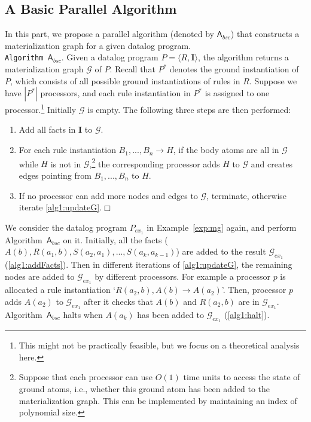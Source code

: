 \documentclass[final,1p,times]{elsarticle}
\begin{document}
\subsection{A Basic Parallel Algorithm}

In this part, we propose a parallel algorithm
(denoted by $\mathsf{A}_{bsc}$) that constructs a materialization graph for a given datalog program.\\

\noindent\texttt{Algorithm $\mathsf{A}_{bsc}$}. Given a datalog program $P=\langle R, \textbf{I}\rangle$,
the algorithm returns a materialization graph $\mathcal{G}$ of $P$.
Recall that $P^*$ denotes the ground instantiation of $P$,
which consists of all possible ground instantiations of rules in $R$.
Suppose we have $|P^*|$ processors, and each rule instantiation in $P^*$ is
assigned to one processor.\footnote{This might not be practically feasible,
but we focus on a theoretical analysis here.}
Initially $\mathcal{G}$ is empty. The following three steps are then performed:
\begin{enumerate}[leftmargin=8ex,label=(\textit{Step \arabic*}),ref=Step~\arabic*]
\item Add all facts in $\textbf{I}$ to $\mathcal{G}$.\label{alg1:addFacts}
\item For each rule instantiation $B_1,...,B_n\rightarrow H$, if the body atoms are all
    in $\mathcal{G}$ while $H$ is not in $\mathcal{G}$,\footnote{Suppose that each processor
    can use $O(1)$ time units to access the state of ground atoms, i.e., whether this ground
    atom has been added to the materialization graph. This can be implemented by maintaining an
    index of polynomial size.}
    the corresponding processor adds $H$ to $\mathcal{G}$ and creates edges pointing
    from $B_1,...,B_n$ to $H$.\label{alg1:updateG}
\item If no processor can add more nodes and edges to $\mathcal{G}$, terminate, otherwise iterate \ref{alg1:updateG}.\label{alg1:halt}\hfill$\Box$
\end{enumerate}

\begin{example}
We consider the datalog program $P_{ex_1}$ in Example~\ref{exp:mg} again,
and perform Algorithm~$\mathsf{A}_{bsc}$ on it.
Initially, all the facts ($A(b),R(a_1,b),S(a_2,a_1),...,S(a_{k},a_{k-1})$) are added to the
result $\mathcal{G}_{ex_1}$ (\ref{alg1:addFacts}).
Then in different iterations of \ref{alg1:updateG}, the remaining nodes are added to
$\mathcal{G}_{ex_1}$ by different processors.
For example a processor $p$ is allocated a rule instantiation `$R(a_2,b),A(b)\rightarrow A(a_2)$'.
Then, processor $p$ adds $A(a_2)$ to $\mathcal{G}_{ex_1}$ after it checks that
$A(b)$ and $R(a_2,b)$ are in $\mathcal{G}_{ex_1}$.
Algorithm~$\mathsf{A}_{bsc}$ halts when $A(a_k)$ has been added to $\mathcal{G}_{ex_1}$ (\ref{alg1:halt}).
\end{example}
\end{document}
